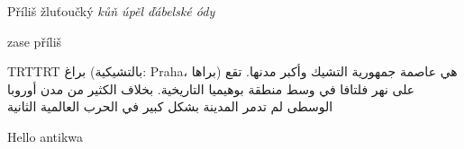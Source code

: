 \documentclass{article}
\newenvironment{arab}{\pardir TRT\textdir TRT\amiri}{}
\begin{document}
Příliš žluťoučký \textit{kůň úpěl ďábelské ódy}

\pokus zase příliš

\begin{arab}
براغ (بالتشيكية: Praha، براها) هي عاصمة جمهورية التشيك وأكبر مدنها. تقع على نهر فلتافا في وسط منطقة بوهيميا التاريخية. بخلاف الكثير من مدن أوروبا الوسطى لم تدمر المدينة بشكل كبير في الحرب العالمية الثانية 
\end{arab}

\apcregular Hello antikwa
\end{document}
